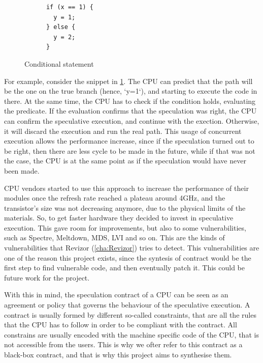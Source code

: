 \begin{figure}
  \centering
  \begin{varwidth}
    {\linewidth} \begin{verbatim}
      if (x == 1) {
        y = 1;
      } else {
        y = 2;
      }
          \end{verbatim}
  \end{varwidth}
  \label{fig:snip1}
  \caption{Conditional statement}
\end{figure}

For example, consider the snippet in \ref{fig:snip1}. The CPU can predict that
the path will be the one on the true branch (hence, `y=1`), and starting to
execute the code in there. At the same time, the CPU has to check if the
condition holds, evaluating the predicate. If the evaluation confirms that the
speculation was right, the CPU can confirm the speculative execution, and
continue with the exection. Otherwise, it will discard the execution and run the
real path. This usage of concurrent execution allows the performance increase,
since if the speculation turned out to be right, then there are less cycle to be
made in the future, while if that was not the case, the CPU is at the same point
as if the speculation would have never been made.

CPU vendors started to use this approach to increase the performance of their modules
once the refresh rate reached a plateau around 4GHz, and the transistor's size
was not decreasing anymore, due to the physical limits of the materials. So, to get
faster hardware they decided to invest in speculative execution. This gave room
for improvements, but also to some vulnerabilities, such as Spectre, Meltdown,
MDS, LVI and so on. This are the kinds of vulnerabilities that Revizor (\ref{cha:Revizor})
tries to detect. This vulnerabilities are one of the reason this project exists,
since the syntesis of contract would be the first step to find vulnerable code, and
then eventually patch it. This could be future work for the project.

With this in mind, the speculation contract of a CPU can be seen as an agreement
or policy that governs the behaviour of the speculative execution. A contract is
usually formed by different so-called constraints, that are all the rules that the
CPU has to follow in order to be compliant with the contract. All constrains are
usually encoded with the machine specific code of the CPU, that is not accessible
from the users. This is why we ofter refer to this contract as a black-box
contract, and that is why this project aims to synthesise them.

